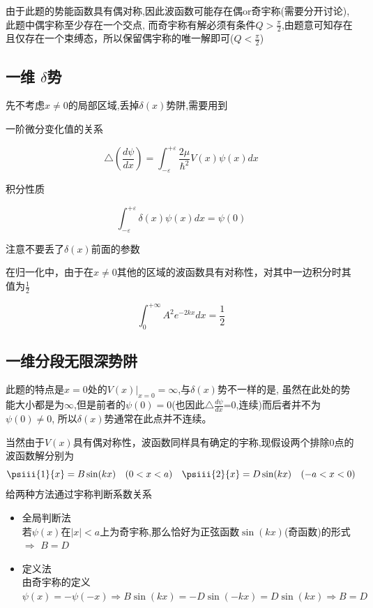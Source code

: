 
            
        
        由于此题的势能函数具有偶对称,因此波函数可能存在偶or奇宇称(需要分开讨论),此题中偶宇称至少存在一个交点,
        而奇宇称有解必须有条件$Q>\frac{\pi}{2}$,由题意可知存在且仅存在一个束缚态，所以保留偶宇称的唯一解即可($Q<\frac{\pi}{2}$)
        
        \subsection{一维 \texorpdfstring{$\delta$}{}势}   %
        
        先不考虑$x\neq0$的局部区域,丢掉$\delta(x)$势阱,需要用到  
        \begin{formal}
            
            \indent 一阶微分变化值的关系  

            $$ \triangle(\frac{d\psi}{dx}) = \int_{-\varepsilon}^{+\varepsilon}\frac{2\mu}{\hbar^2}V(x)\psi(x)dx $$     %

            积分性质

            $$\int_{-\varepsilon}^{+\varepsilon} \delta(x) \psi(x) dx =\psi(0) $$

        \end{formal}
        
        
        注意不要丢了$\delta(x)$前面的参数
        
        
        在归一化中，由于在$x\neq 0$其他的区域的波函数具有对称性，对其中一边积分时其值为$\frac{1}{2}$
        
        $$ \int_{0}^{+\infty}A^2 e^{-2kx} dx = \frac{1}{2} $$
        
        
    \subsection{一维分段无限深势阱}
        此题的特点是$x=0$处的$V(x)|_{x=0}=\infty$,与$\delta(x)$势不一样的是,
        虽然在此处的势能大小都是为$\infty$,但是前者的$\psi(0)=0$(也因此$\triangle \frac{d\psi}{dx}$=0,连续)而后者并不为$\psi(0)\neq0$,
        所以$\delta(x)$势通常在此点并不连续。

        当然由于$V(x)$具有偶对称性，波函数同样具有确定的宇称,现假设两个排除0点的波函数解分别为
        $$\psiii{1}{x}=B\sin(kx) \quad (0<x<a) \quad \psiii{2}{x}=D\sin(kx) \quad (-a<x<0)$$
        给两种方法通过宇称判断系数关系
        \begin{itemize}
            \item 全局判断法   \\
                若$\psi(x)$在$|x|<a$上为奇宇称,那么恰好为正弦函数$\sin(kx)$(奇函数)的形式 $\Rightarrow$ $B = D$ 
            \item 定义法    \\
                由奇宇称的定义$\psi(x)=-\psi(-x) \Rightarrow B\sin(kx)=-D\sin(-kx)=D\sin(kx) \Rightarrow B=D$ 
        \end{itemize}
        
